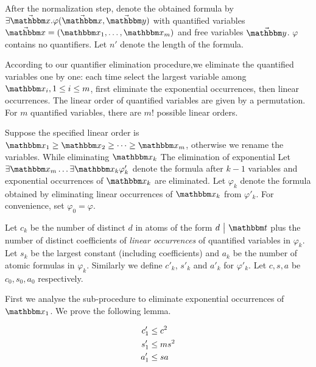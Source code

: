 After the normalization step, denote the obtained formula by $\exists \vec{\ivarx}. \varphi(\vec{\ivarx},\vec{\ivary})$ with quantified variables $\vec{\ivarx} = (\ivarx_1,\dots,\ivarx_m)$ and free variables $\vec{\ivary}$. $\varphi$ contains no quantifiers. 
Let $n'$ denote the length of the formula.

According to our quantifier elimination procedure,we eliminate the quantified variables one by one: each time select the largest variable among $\ivarx_i,1\le i\le m$, first eliminate the exponential occurrences, then linear occurrences. The linear order of quantified variables are given by a permutation. For $m$ quantified variables, there are $m!$ possible linear orders.

Suppose the specified linear order is $\ivarx_1\ge \ivarx_2 \ge \dots \ge \ivarx_m$, otherwise we rename the variables. While eliminating $\ivarx_k$
The elimination of exponential
Let $\exists \ivarx_m \dots \exists \ivarx_{k}\varphi'_k$ denote the formula after $k-1$ variables and exponential occurrences of $\ivarx_k$ are eliminated. Let $\varphi_k$ denote the formula obtained by eliminating linear occurrences of $\ivarx_k$ from $\varphi'_k$. For convenience, set $\varphi_0=\varphi$.

Let $c_k$ be the number of distinct $d$ in atoms of the form $d \ \big | \ \iterm$ plus the number of distinct coefficients of \emph{linear occurrences} of quantified variables in $\varphi_k$. Let $s_k$ be the largest constant (including coefficients) and $a_k$ be the number of atomic formulas in $\varphi_k$. Similarly we define $c'_k$, $s'_k$ and $a'_k$ for $\varphi'_k$. Let $c,s,a$ be $c_0,s_0,a_0$ respectively. 

First we analyse the sub-procedure to eliminate exponential occurrences of $\ivarx_1$. We prove the following lemma.

\begin{lemma}\label{lem:cpx exp}
    \begin{align}
        c'_1&\le c^2 \notag \\
        s'_1&\le ms^2 \notag\\
        a'_1&\le sa\notag 
    \end{align} 
\end{lemma}

